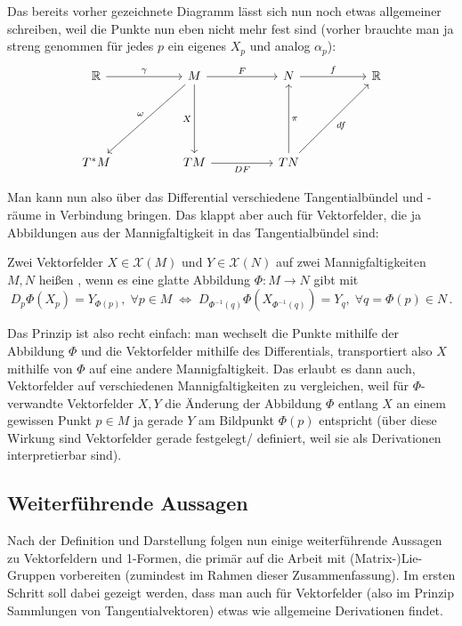 \documentclass[../H_Analysis_main.tex]{subfiles}
\begin{document}
Das bereits vorher gezeichnete Diagramm lässt sich nun noch etwas allgemeiner schreiben, weil die Punkte nun eben nicht mehr fest sind (vorher brauchte man ja streng genommen für jedes $p$ ein eigenes $X_p$ und analog $\alpha_p$):
$$
\begin{tikzcd}[row sep = 56, column sep = 50]
\mathbb{R} \arrow{r}{\gamma} & M \arrow[swap]{d}{X} \arrow[swap]{dl}{\omega} \arrow{r}{F} & N
\arrow{r}{f} & \mathbb{R} \\
T^*M & TM  \arrow[swap]{r}{DF} & TN \arrow[swap]{u}{\pi} \arrow[swap]{ur}{df} &
\end{tikzcd}
$$

Man kann nun also über das Differential verschiedene Tangentialbündel und -räume in Verbindung bringen. Das klappt aber auch für Vektorfelder, die ja Abbildungen aus der Mannigfaltigkeit in das Tangentialbündel sind:

\begin{defi}[Verwandtschaft]\label{defi:verwandtsch}
Zwei Vektorfelder $X \in \mathcal{X}(M)$ und $Y \in \mathcal{X}(N)$ auf zwei Mannigfaltigkeiten $M, N$ heißen , wenn es eine glatte Abbildung $\Phi: M \rightarrow N$ gibt mit
\begin{equation}
D_p \Phi(X_p) = Y_{\Phi(p)}, \; \forall p \in M \; \Leftrightarrow \; D_{\Phi^{-1}(q)} \Phi(X_{\Phi^{-1}(q)}) = Y_q, \; \forall q = \Phi(p) \in N \, .
\end{equation}
\end{defi}

Das Prinzip ist also recht einfach: man wechselt die Punkte mithilfe der Abbildung $\Phi$ und die Vektorfelder mithilfe des Differentials, transportiert also $X$ mithilfe von $\Phi$ auf eine andere Mannigfaltigkeit. Das erlaubt es dann auch, Vektorfelder auf verschiedenen Mannigfaltigkeiten zu vergleichen, weil für $\Phi$-verwandte Vektorfelder $X, Y$ die Änderung der Abbildung $\Phi$ entlang $X$ an einem gewissen Punkt $p \in M$ ja gerade $Y$ am Bildpunkt $\Phi(p)$ entspricht (über diese Wirkung sind Vektorfelder gerade festgelegt/ definiert, weil sie als Derivationen interpretierbar sind).




		\subsection{Weiterführende Aussagen}
Nach der Definition und Darstellung folgen nun einige weiterführende Aussagen zu Vektorfeldern und 1-Formen, die primär auf die Arbeit mit (Matrix-)Lie-Gruppen vorbereiten (zumindest im Rahmen dieser Zusammenfassung). Im ersten Schritt soll dabei gezeigt werden, dass man auch für Vektorfelder (also im Prinzip Sammlungen von Tangentialvektoren) etwas wie allgemeine Derivationen findet.
\end{document}
